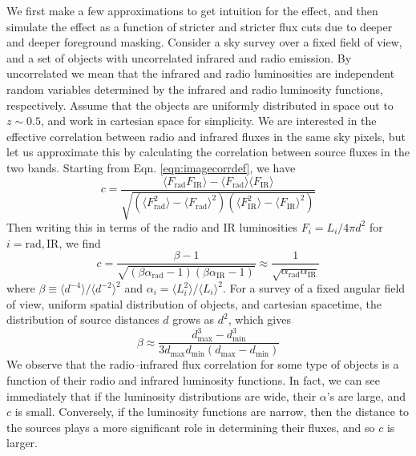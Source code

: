 \documentclass{emulateapj}
\newcommand{\mintext}{\text{min}}
\newcommand{\maxtext}{\text{max}}
\newcommand{\rad}{\text{rad}}
\newcommand{\ir}{\text{IR}}
\begin{document}
We first make a few approximations to get intuition for the effect, and then simulate the effect as a function of stricter and stricter flux cuts due to deeper and deeper foreground masking. Consider a sky survey over a fixed field of view, and a set of objects with uncorrelated infrared and radio emission. By uncorrelated we mean that the infrared and radio luminosities are independent random variables determined by the infrared and radio luminosity functions, respectively. Assume that the objects are uniformly distributed in space out to $z\sim0.5$, and work in cartesian space for simplicity. We are interested in the effective correlation between radio and infrared fluxes in the same sky pixels, but let us approximate this by calculating the correlation between source fluxes in the two bands. Starting from Eqn. \ref{eqn:imagecorrdef}, we have
\begin{equation} %
	c = \frac{\langle F_\rad F_\ir \rangle-\langle F_\rad\rangle\langle F_\ir\rangle}{\sqrt{(\langle F_\rad^2\rangle-\langle F_\rad\rangle^2)(\langle F_\ir^2\rangle-\langle F_\ir\rangle^2)}}
\end{equation}
Then writing this in terms of the radio and IR luminosities $F_i=L_i/4\pi d^2$ for $i=\rad,\ir$, we find
\begin{equation}
	c = \frac{\beta-1}{\sqrt{(\beta\alpha_\rad-1)(\beta\alpha_\ir-1)}}\approx\frac{1}{\sqrt{\alpha_\rad \alpha_\ir}}
\end{equation}
where $\beta\equiv\langle d^{-4}\rangle/\langle d^{-2}\rangle^2$ and $\alpha_i=\langle L_i^2\rangle/\langle L_i\rangle^2$.
For a survey of a fixed angular field of view, uniform spatial distribution of objects, and cartesian spacetime, the distribution of source distances $d$ grows as $d^2$, which gives 
\begin{equation}
	\beta\approx\frac{d_\maxtext^3-d_\mintext^3}{3d_\maxtext d_\mintext (d_\maxtext-d_\mintext)}
\end{equation}
We observe that the radio--infrared flux correlation for some type of objects is a function of their radio and infrared luminosity functions. In fact, we can see immediately that if the luminosity distributions are wide, their $\alpha$'s are large, and $c$ is small. Conversely, if the luminosity functions are narrow, then the distance to the sources plays a more significant role in determining their fluxes, and so $c$ is larger. 
\end{document}
